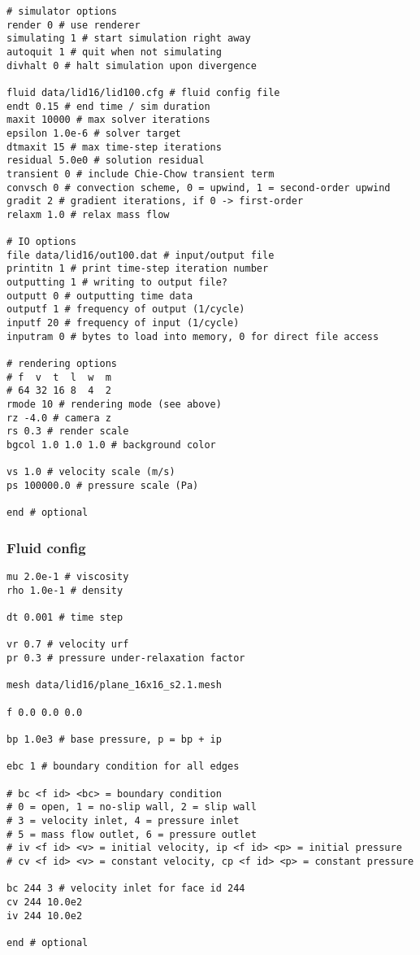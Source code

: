 \documentclass[12pt]{article}
\begin{document}
\begin{verbatim}
# simulator options
render 0 # use renderer
simulating 1 # start simulation right away
autoquit 1 # quit when not simulating
divhalt 0 # halt simulation upon divergence

fluid data/lid16/lid100.cfg # fluid config file
endt 0.15 # end time / sim duration
maxit 10000 # max solver iterations
epsilon 1.0e-6 # solver target
dtmaxit 15 # max time-step iterations
residual 5.0e0 # solution residual
transient 0 # include Chie-Chow transient term
convsch 0 # convection scheme, 0 = upwind, 1 = second-order upwind
gradit 2 # gradient iterations, if 0 -> first-order
relaxm 1.0 # relax mass flow

# IO options
file data/lid16/out100.dat # input/output file
printitn 1 # print time-step iteration number
outputting 1 # writing to output file?
outputt 0 # outputting time data
outputf 1 # frequency of output (1/cycle)
inputf 20 # frequency of input (1/cycle)
inputram 0 # bytes to load into memory, 0 for direct file access

# rendering options
# f  v  t  l  w  m
# 64 32 16 8  4  2
rmode 10 # rendering mode (see above)
rz -4.0 # camera z
rs 0.3 # render scale
bgcol 1.0 1.0 1.0 # background color

vs 1.0 # velocity scale (m/s)
ps 100000.0 # pressure scale (Pa)

end # optional
\end{verbatim}

\subsubsection{Fluid config}

\begin{verbatim}
mu 2.0e-1 # viscosity
rho 1.0e-1 # density

dt 0.001 # time step

vr 0.7 # velocity urf
pr 0.3 # pressure under-relaxation factor

mesh data/lid16/plane_16x16_s2.1.mesh

f 0.0 0.0 0.0

bp 1.0e3 # base pressure, p = bp + ip

ebc 1 # boundary condition for all edges

# bc <f id> <bc> = boundary condition
# 0 = open, 1 = no-slip wall, 2 = slip wall
# 3 = velocity inlet, 4 = pressure inlet
# 5 = mass flow outlet, 6 = pressure outlet
# iv <f id> <v> = initial velocity, ip <f id> <p> = initial pressure
# cv <f id> <v> = constant velocity, cp <f id> <p> = constant pressure

bc 244 3 # velocity inlet for face id 244
cv 244 10.0e2
iv 244 10.0e2

end # optional
\end{verbatim}
\end{document}
